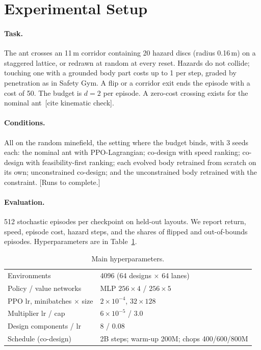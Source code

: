 \documentclass[sigconf,review]{acmart}
\newcommand{\TODO}[1]{\textcolor{red!70!black}{[#1]}}
\begin{document}
\section{Experimental Setup}
\label{sec:setup}

\paragraph{Task.} The ant crosses an 11\,m corridor containing 20 hazard discs (radius 0.16\,m) on a staggered lattice, or redrawn at random at every reset. Hazards do not collide; touching one with a grounded body part costs up to 1 per step, graded by penetration as in Safety Gym. A flip or a corridor exit ends the episode with a cost of 50. The budget is $d = 2$ per episode. A zero-cost crossing exists for the nominal ant~\TODO{cite kinematic check}.

\paragraph{Conditions.} All on the random minefield, the setting where the budget binds, with 3 seeds each: the nominal ant with PPO-Lagrangian; co-design with speed ranking; co-design with feasibility-first ranking; each evolved body retrained from scratch on its own; unconstrained co-design; and the unconstrained body retrained with the constraint. \TODO{Runs to complete.}

\paragraph{Evaluation.} 512 stochastic episodes per checkpoint on held-out layouts. We report return, speed, episode cost, hazard steps, and the shares of flipped and out-of-bounds episodes. Hyperparameters are in Table~\ref{tab:hparams}.

\begin{table}[t]
\caption{Main hyperparameters.}
\label{tab:hparams}
\footnotesize
\begin{tabular}{ll}
\toprule
Environments & 4096 (64 designs $\times$ 64 lanes) \\
Policy / value networks & MLP $256\times4$ / $256\times5$ \\
PPO lr, minibatches $\times$ size & $2\times10^{-4}$, $32\times128$ \\
Multiplier lr / cap & $6\times10^{-5}$ / 3.0 \\
Design components / lr & 8 / 0.08 \\
Schedule (co-design) & 2B steps; warm-up 200M; chops 400/600/800M \\
\bottomrule
\end{tabular}
\end{table}
\end{document}

